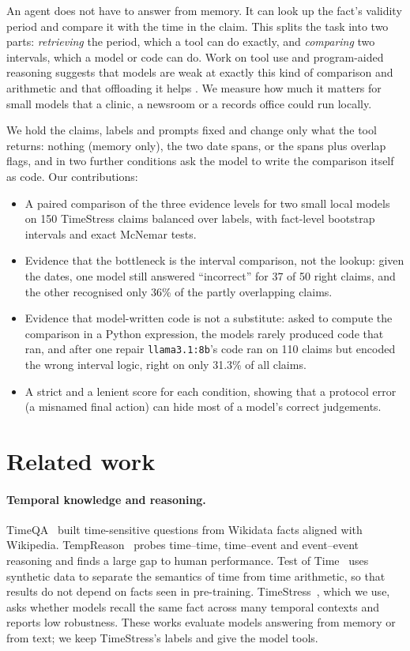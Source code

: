 \documentclass[11pt,a4paper]{article}
\newcommand{\code}[1]{\texttt{#1}}
\begin{document}
An agent does not have to answer from memory. It can look up the fact's validity period and compare it with the time
in the claim. This splits the task into two parts: \emph{retrieving} the period, which a tool can do exactly, and
\emph{comparing} two intervals, which a model or code can do. Work on tool use and program-aided reasoning suggests
that models are weak at exactly this kind of comparison and arithmetic and that offloading it helps
\cite{schick2023toolformer,gao2023pal}. We measure how much it matters for small models that a clinic, a newsroom
or a records office could run locally.

We hold the claims, labels and prompts fixed and change only what the tool returns: nothing (memory only), the two
date spans, or the spans plus overlap flags, and in two further conditions ask the model to write the comparison
itself as code. Our contributions:
\begin{itemize}
  \item A paired comparison of the three evidence levels for two small local models on 150 TimeStress claims balanced
  over labels, with fact-level bootstrap intervals and exact McNemar tests.
  \item Evidence that the bottleneck is the interval comparison, not the lookup: given the dates, one model still
  answered ``incorrect'' for 37 of 50 right claims, and the other recognised only 36\% of the partly overlapping claims.
  \item Evidence that model-written code is not a substitute: asked to compute the comparison in a Python expression,
  the models rarely produced code that ran, and after one repair \code{llama3.1:8b}'s code ran on 110 claims but
  encoded the wrong interval logic, right on only 31.3\% of all claims.
  \item A strict and a lenient score for each condition, showing that a protocol error (a misnamed final action) can
  hide most of a model's correct judgements.
\end{itemize}

\section{Related work}

\paragraph{Temporal knowledge and reasoning.} TimeQA~\cite{chen2021timeqa} built time-sensitive questions from
Wikidata facts aligned with Wikipedia. TempReason~\cite{tan2023tempreason} probes time--time, time--event and
event--event reasoning and finds a large gap to human performance. Test of Time~\cite{fatemi2025testoftime} uses
synthetic data to separate the semantics of time from time arithmetic, so that results do not depend on facts seen
in pre-training. TimeStress~\cite{khodja2025timestress}, which we use, asks whether models recall the same fact
across many temporal contexts and reports low robustness. These works evaluate models answering from memory or from
text; we keep TimeStress's labels and give the model tools.
\end{document}
